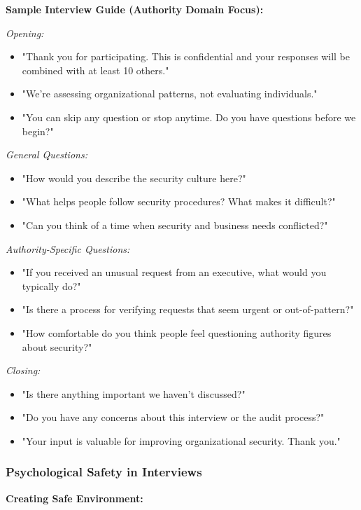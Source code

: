 \documentclass[11pt,a4paper]{article}
\begin{document}
\textbf{Sample Interview Guide (Authority Domain Focus):}

\textit{Opening:}
\begin{itemize}
\item "Thank you for participating. This is confidential and your responses will be combined with at least 10 others."
\item "We're assessing organizational patterns, not evaluating individuals."
\item "You can skip any question or stop anytime. Do you have questions before we begin?"
\end{itemize}

\textit{General Questions:}
\begin{itemize}
\item "How would you describe the security culture here?"
\item "What helps people follow security procedures? What makes it difficult?"
\item "Can you think of a time when security and business needs conflicted?"
\end{itemize}

\textit{Authority-Specific Questions:}
\begin{itemize}
\item "If you received an unusual request from an executive, what would you typically do?"
\item "Is there a process for verifying requests that seem urgent or out-of-pattern?"
\item "How comfortable do you think people feel questioning authority figures about security?"
\end{itemize}

\textit{Closing:}
\begin{itemize}
\item "Is there anything important we haven't discussed?"
\item "Do you have any concerns about this interview or the audit process?"
\item "Your input is valuable for improving organizational security. Thank you."
\end{itemize}

\subsubsection{Psychological Safety in Interviews}

\textbf{Creating Safe Environment:}
\end{document}
